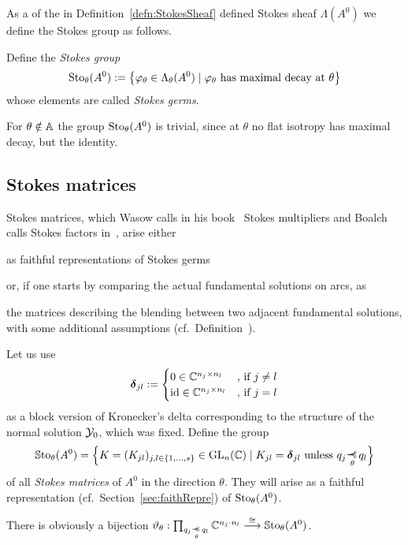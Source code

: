 As a  of the in
Definition~\ref{defn:StokesSheaf} defined Stokes sheaf $\Lambda(A^0)$ we
define the Stokes group as follows.
\begin{defn}\label{defn:stokesGroup}
  Define the \emph{Stokes group}
  \[
    \operatorname{Sto}_\theta(A^0):=
    \left\{\varphi_\theta\in\Lambda_\theta(A^0)
      \mid \varphi_\theta \text{~has maximal decay at~} \theta
    \right\}
  \]
  whose elements are called \emph{Stokes germs}.
  \begin{s-rem}
    For $\theta\notin\mathbb{A}$ the group $\operatorname{Sto}_\theta(A^0)$ is trivial, since at
    $\theta$ no flat isotropy has maximal decay, but the identity.
  \end{s-rem}
\end{defn}

\subsection{Stokes matrices}\label{sec:matrixReps}
Stokes matrices, which Wasow calls in his book~\cite{wasow2002asymptotic}
Stokes multipliers and Boalch calls Stokes factors in~\cite{boalch,thboalch},
arise either
\begin{einr}
  as faithful representations of Stokes germs
\end{einr}
or, if one starts by comparing the actual fundamental solutions on arcs, as
\begin{einr}
  the matrices describing the blending between two adjacent fundamental
  solutions, with some additional assumptions
  (cf.\ Definition~\cite[80]{Loday2014}).
\end{einr}
\begin{defn}\label{defn:groupOfFaithfullReps}
  Let us use
  \[
    \boldsymbol{\delta}_{jl}:=
    \begin{cases}
      0 \in \mathbb{C}^{n_j\times n_l} & \text{,~if~} j\neq l
    \\\operatorname{id} \in \mathbb{C}^{n_j\times n_l} & \text{,~if~} j=l
    \end{cases}
  \]
  as a block version of Kronecker's delta corresponding to the structure of the
  normal solution $\mathcal{Y}_0$, which was fixed.
  Define the group
  \begin{align*}
    \SSto_\theta(A^0)= \Big\{K=(K_{jl})_{j,l\in\{1,\dots,s\}}\in\GL_n(\C) \mid
      K_{jl}=\bdelta_{jl} \text{~unless~} q_j\myrel{\theta}q_l \Big\}
  \end{align*}
  of all \emph{Stokes matrices} of $A^0$ in the direction $\theta$.
  They will arise as a faithful representation
  (cf.\ Section~\ref{sec:faithRepre}) of $\operatorname{Sto}_\theta(A^0)$.
  \begin{s-rem}\label{rem:groupOfFaithfullReps}
    There is obviously a bijection
    $\vartheta_\theta: \prod_{q_j\myrel{\theta}q_l}\C^{n_j \cdot n_l}
    \overset{\cong}{\longrightarrow} \SSto_\theta(A^0)$.
  \end{s-rem}
\end{defn}

